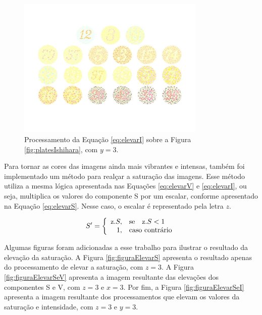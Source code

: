 \documentclass[	12pt, Times, openright, twoside, a4paper, english, brazil]{abntex2}
\begin{document}
\begin{figure}[!htb]
\centering \includegraphics[width=0.80\textwidth]{figuraElevarI.jpg}
\caption{Processamento da Equação \ref{eq:elevarI} sobre a Figura \ref{fig:platesIshihara}, com $y = 3$. \label{fig:figuraElevarI}}
\end{figure}

Para tornar as cores das imagens ainda mais vibrantes e intensas, também foi implementado um método para realçar a saturação das imagens. Esse método utiliza a mesma lógica apresentada nas Equações \ref{eq:elevarV} e \ref{eq:elevarI}, ou seja, multiplica os valores do componente S por um escalar, conforme apresentado na Equação \ref{eq:elevarS}. Nesse caso, o escalar é representado pela letra $z$.

\begin{equation}
\label{eq:elevarS}
S'=\left\{
\begin{array}{rl}
       $z$ . S,&\mbox{se}\quad $z$ . S < 1 \\
       1,&\mbox{caso contrário}
\end{array}\right.
\end{equation}

Algumas figuras foram adicionadas a esse trabalho para ilustrar o resultado da elevação da saturação. A Figura \ref{fig:figuraElevarS} apresenta o resultado apenas do processamento de elevar a saturação, com $z=3$. A Figura \ref{fig:figuraElevarSeV} apresenta a imagem resultante das elevações dos componentes S e V, com $z = 3$ e $x = 3$. Por fim, a Figura \ref{fig:figuraElevarSeI} apresenta a imagem resultante dos processamentos que elevam os valores da saturação e intensidade, com $z = 3$ e $y = 3$.
\end{document}

